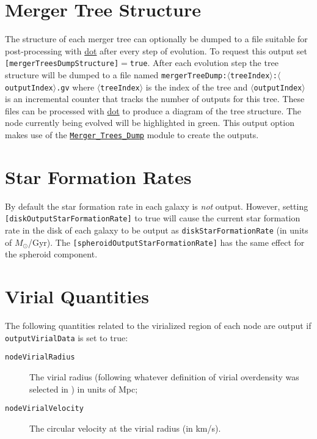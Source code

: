 \section{Merger Tree Structure}

The structure of each merger tree can optionally be dumped to a file suitable for post-processing with \href{http://www.graphviz.org/}{\sc dot} after every step of evolution. To request this output set {\tt [mergerTreesDumpStructure]}$=${\tt true}. After each evolution step the tree structure will be dumped to a file named {\tt mergerTreeDump:$\langle$treeIndex$\rangle$:$\langle$outputIndex$\rangle$.gv} where $\langle${\tt treeIndex}$\rangle$ is the index of the tree and $\langle${\tt outputIndex}$\rangle$ is an incremental counter that tracks the number of outputs for this tree. These files can be processed with \href{http://www.graphviz.org/}{\sc dot} to produce a diagram of the tree structure. The node currently being evolved will be highlighted in green. This output option makes use of the \hyperlink{objects.merger_trees.dump.F90:merger_trees_dump}{\tt Merger\_Trees\_Dump} module to create the outputs.

\section{Star Formation Rates}

By default the star formation rate in each galaxy is \emph{not} output. However, setting {\tt [diskOutputStarFormationRate]} to true will cause the current star formation rate in the disk of each galaxy to be output as {\tt diskStarFormationRate} (in units of $M_\odot$/Gyr). The {\tt [spheroidOutputStarFormationRate]} has the same effect for the spheroid component.

\section{Virial Quantities}

The following quantities related to the virialized region of each node are output if {\tt outputVirialData} is set to true:
\begin{description}
 \item [{\tt nodeVirialRadius}] The virial radius (following whatever definition of virial overdensity was selected in \glc) in units of Mpc;
 \item [{\tt nodeVirialVelocity}] The circular velocity at the virial radius (in km/s).
\end{description}
